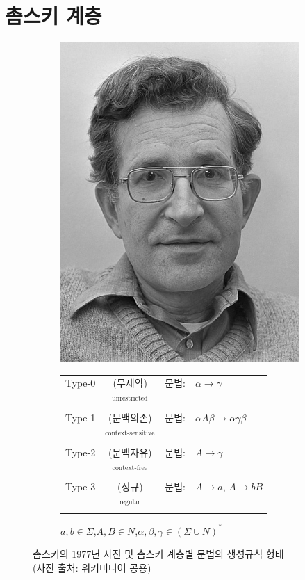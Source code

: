 \documentclass[b5paper,chapter,figtabcapt]{oblivoir}
\begin{document}
\section{촘스키 계층}
\begin{figure}\centering
\begin{subfigure}{.25\textwidth}
\includegraphics[]{Chomsky1977.jpg}
\end{subfigure}
\begin{subfigure}{.6\textwidth}
\begin{tabular}{lcrl}
Type-0\!\!\!\!\!\!&(무제약)  &\!\!\!\!\!\!문법:& $\alpha\to\gamma$
\\    \!\!\!\!\!\!&$^{\text{unrestricted}}$& \\
Type-1\!\!\!\!\!\!&(문맥의존)&\!\!\!\!\!\!문법:& $\alpha A\beta\to\alpha\gamma\beta$
\\    \!\!\!\!\!\!&$^{\text{context-sensitive}}$& \\
Type-2\!\!\!\!\!\!&(문맥자유)&\!\!\!\!\!\!문법:& $A\to \gamma$
\\    \!\!\!\!\!\!&$^{\text{context-free}}$& \\
Type-3\!\!\!\!\!\!&(정규)    &\!\!\!\!\!\!문법:& $A\to a$, $A\to bB$
\\    \!\!\!\!\!\!&$^{\text{regular}}$&
\end{tabular}
\begin{center}
\quad$a,b\in \Sigma$,\quad$A,B\in N$,\quad$\alpha,\beta,\gamma\in(\Sigma\cup N)^{*}$
\end{center}
\end{subfigure}
\caption{촘스키의 1977년 사진 및 촘스키 계층별 문법의 생성규칙 형태
         \label{fig:ChomskyHierarchyGrammar}\\
         {\scriptsize(사진 출처: 위키미디어 공용)} }
\end{figure}
\end{document}
